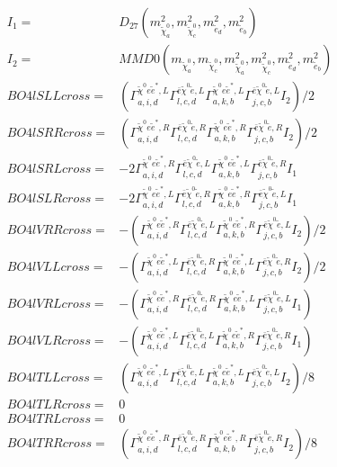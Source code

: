 \documentclass[A4,landscape]{article}
\begin{document}
\begin{align} 
I_1 = & D_{27}(m^2_{\tilde{\chi}^0_{{a}}}, m^2_{\tilde{\chi}^0_{{c}}}, m^2_{\tilde{e}_{{d}}}, m^2_{\tilde{e}_{{b}}}) \\ 
I_2 = & MMD0(m_{\tilde{\chi}^0_{{a}}}, m_{\tilde{\chi}^0_{{c}}}, m^2_{\tilde{\chi}^0_{{a}}}, m^2_{\tilde{\chi}^0_{{c}}}, m^2_{\tilde{e}_{{d}}}, m^2_{\tilde{e}_{{b}}}) \\ 
  BO4lSLLcross= & ( \Gamma^{\tilde{\chi}^0 e \tilde{e}^*,L}_{a, i, d} \Gamma^{\bar{e}\tilde{\chi}^0 \tilde{e} ,L}_{l, c, d} \Gamma^{\tilde{\chi}^0 e \tilde{e}^*,L}_{a, k, b} \Gamma^{\bar{e}\tilde{\chi}^0 \tilde{e} ,L}_{j, c, b} I_2)/2 \\ 
  BO4lSRRcross= & ( \Gamma^{\tilde{\chi}^0 e \tilde{e}^*,R}_{a, i, d} \Gamma^{\bar{e}\tilde{\chi}^0 \tilde{e} ,R}_{l, c, d} \Gamma^{\tilde{\chi}^0 e \tilde{e}^*,R}_{a, k, b} \Gamma^{\bar{e}\tilde{\chi}^0 \tilde{e} ,R}_{j, c, b} I_2)/2 \\ 
  BO4lSRLcross= & -2  \Gamma^{\tilde{\chi}^0 e \tilde{e}^*,R}_{a, i, d} \Gamma^{\bar{e}\tilde{\chi}^0 \tilde{e} ,L}_{l, c, d} \Gamma^{\tilde{\chi}^0 e \tilde{e}^*,L}_{a, k, b} \Gamma^{\bar{e}\tilde{\chi}^0 \tilde{e} ,R}_{j, c, b} I_1 \\ 
  BO4lSLRcross= & -2  \Gamma^{\tilde{\chi}^0 e \tilde{e}^*,L}_{a, i, d} \Gamma^{\bar{e}\tilde{\chi}^0 \tilde{e} ,R}_{l, c, d} \Gamma^{\tilde{\chi}^0 e \tilde{e}^*,R}_{a, k, b} \Gamma^{\bar{e}\tilde{\chi}^0 \tilde{e} ,L}_{j, c, b} I_1 \\ 
  BO4lVRRcross= & -( \Gamma^{\tilde{\chi}^0 e \tilde{e}^*,R}_{a, i, d} \Gamma^{\bar{e}\tilde{\chi}^0 \tilde{e} ,L}_{l, c, d} \Gamma^{\tilde{\chi}^0 e \tilde{e}^*,R}_{a, k, b} \Gamma^{\bar{e}\tilde{\chi}^0 \tilde{e} ,L}_{j, c, b} I_2)/2 \\ 
  BO4lVLLcross= & -( \Gamma^{\tilde{\chi}^0 e \tilde{e}^*,L}_{a, i, d} \Gamma^{\bar{e}\tilde{\chi}^0 \tilde{e} ,R}_{l, c, d} \Gamma^{\tilde{\chi}^0 e \tilde{e}^*,L}_{a, k, b} \Gamma^{\bar{e}\tilde{\chi}^0 \tilde{e} ,R}_{j, c, b} I_2)/2 \\ 
  BO4lVRLcross= & -( \Gamma^{\tilde{\chi}^0 e \tilde{e}^*,R}_{a, i, d} \Gamma^{\bar{e}\tilde{\chi}^0 \tilde{e} ,R}_{l, c, d} \Gamma^{\tilde{\chi}^0 e \tilde{e}^*,L}_{a, k, b} \Gamma^{\bar{e}\tilde{\chi}^0 \tilde{e} ,L}_{j, c, b} I_1) \\ 
  BO4lVLRcross= & -( \Gamma^{\tilde{\chi}^0 e \tilde{e}^*,L}_{a, i, d} \Gamma^{\bar{e}\tilde{\chi}^0 \tilde{e} ,L}_{l, c, d} \Gamma^{\tilde{\chi}^0 e \tilde{e}^*,R}_{a, k, b} \Gamma^{\bar{e}\tilde{\chi}^0 \tilde{e} ,R}_{j, c, b} I_1) \\ 
  BO4lTLLcross= & ( \Gamma^{\tilde{\chi}^0 e \tilde{e}^*,L}_{a, i, d} \Gamma^{\bar{e}\tilde{\chi}^0 \tilde{e} ,L}_{l, c, d} \Gamma^{\tilde{\chi}^0 e \tilde{e}^*,L}_{a, k, b} \Gamma^{\bar{e}\tilde{\chi}^0 \tilde{e} ,L}_{j, c, b} I_2)/8 \\ 
  BO4lTLRcross= & 0 \\ 
  BO4lTRLcross= & 0 \\ 
  BO4lTRRcross= & ( \Gamma^{\tilde{\chi}^0 e \tilde{e}^*,R}_{a, i, d} \Gamma^{\bar{e}\tilde{\chi}^0 \tilde{e} ,R}_{l, c, d} \Gamma^{\tilde{\chi}^0 e \tilde{e}^*,R}_{a, k, b} \Gamma^{\bar{e}\tilde{\chi}^0 \tilde{e} ,R}_{j, c, b} I_2)/8 \\ 
\end{align} 
\end{document}

